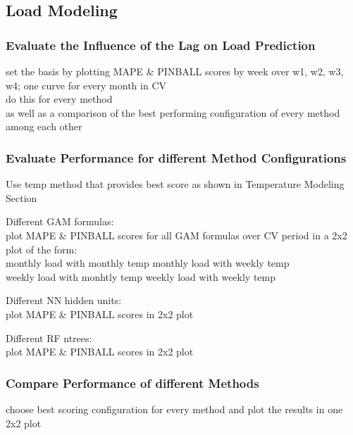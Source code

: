 \documentclass[conference]{IEEEtran}
\begin{document}
\subsection{Load Modeling}

\subsubsection{Evaluate the Influence of the Lag on Load Prediction}
set the basis by plotting MAPE \& PINBALL scores by week over w1, w2, w3, w4; one curve for every month in CV\\
do this for every method\\
as well as a comparison of the best performing configuration of every method among each other\\

\subsubsection{Evaluate Performance for different Method Configurations}
Use temp method that provides best score as shown in Temperature Modeling Section\par
Different GAM formulas:\\
plot MAPE \& PINBALL scores for all GAM formulas over CV period in a 2x2 plot of the form:\\
monthly load with monthly temp \quad monthly load with weekly temp\\
weekly load with monhtly temp \quad weekly load with weekly temp\par
\vspace*{5pt}
Different NN hidden units:\\
plot MAPE \& PINBALL scores in 2x2 plot\par
Different RF ntrees:\\ 
plot MAPE \& PINBALL scores in 2x2 plot\par

\subsubsection{Compare Performance of different Methods}
choose best scoring configuration for every method and plot the results in one 2x2 plot
\end{document}
